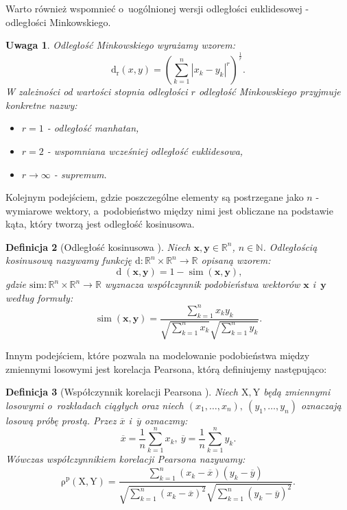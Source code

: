 \documentclass[12pt,a4paper]{report}
\newtheorem{df}{Definicja}[chapter]
\newtheorem{uwaga}[df]{Uwaga}
\newcommand{\setR}{\mathbb{R}}
\newcommand{\setN}{\mathbb{N}}
\newcommand{\rop}[2]{\operatorname{\rho^p}\left( {#1},{#2} \right)}
\newcommand{\similarity}[2]{\operatorname{sim}\left({#1}, {#2} \right)}
\newcommand{\distance}[2]{\operatorname{d}\left({#1}, {#2} \right)}
\newcommand{\distancee}[2]{\operatorname{d_r}\left({#1}, {#2} \right)}
\begin{document}
Warto również wspomnieć o~uogólnionej wersji odległości euklidesowej - odległości Minkowskiego.
\begin{uwaga}
Odległość Minkowskiego wyrażamy wzorem:
$$
\distancee{x}{y} = (\sum_{k=1}^n|x_k-y_k|^r)^{\frac{1}{r}}.
$$
W zależności od wartości stopnia odległości $r$ odległość Minkowskiego przyjmuje konkretne nazwy:
\begin{itemize}
\item $r=1$ - odległość manhatan,
\item $r=2$ - wspomniana wcześniej odległość euklidesowa,
\item $r \to \infty $ - supremum. 
\end{itemize}
\end{uwaga}
Kolejnym podejściem, gdzie poszczególne elementy są postrzegane jako $n$ - wymiarowe wektory, a~podobieństwo między nimi jest obliczane na podstawie kąta, który tworzą jest odległość kosinusowa.

\begin{df}[Odległość kosinusowa \citep{rsh}] %
Niech $\mathbf{x},\mathbf{y} \in \setR^n $, $n \in\setN$. Odległością kosinusową nazywamy funkcję $ \mathrm{d}: \setR^n \times \setR^n \to \setR$ opisaną wzorem:
$$
\distance{\mathbf{x}}{\mathbf{y}} = 1 - \similarity{\mathbf{x}}{\mathbf{y}},
$$ 
gdzie $\mathrm{sim}: \setR^n \times \setR^n \to \setR$ wyznacza współczynnik podobieństwa wektorów $\mathbf{x}$ i~$\mathbf{y}$ według formuły:
$$
\similarity{\mathbf{x}}{\mathbf{y}} = \frac{\sum_{k=1}^n x_k y_k}{\sqrt{\sum_{k=1}^n x_k}\sqrt{\sum_{k=1}^n y_k}}.
$$
\end{df}
Innym podejściem, które pozwala na modelowanie podobieństwa między zmiennymi losowymi jest korelacja Pearsona, którą definiujemy następująco:

\begin{df}[Współczynnik korelacji Pearsona \citep{rsh}]

Niech $\mathrm{X},\mathrm{Y}$ będą zmiennymi losowymi o~rozkładach ciągłych oraz niech $(x_1, \ldots, x_n), \: (y_1, \ldots, y_n)$ oznaczają losową próbę prostą. 
Przez $\overline{x}$ i~$\overline{y}$ oznaczmy:
$$
\overline{x}=\frac{1}{n} \sum_{k=1}^n x_k, \: \overline{y}=\frac{1}{n} \sum_{k=1}^n y_k.
$$
Wówczas współczynnikiem korelacji Pearsona nazywamy:
$$
\rop{\mathrm{X}}{\mathrm{Y}} = \frac{\sum_{k=1}^n(x_k - \overline{x})(y_k - \overline{y})}{\sqrt{\sum_{k=1}^n(x_k - \overline{x})^2} \sqrt{\sum_{k=1}^n(y_k - \overline{y})^2 }}.
$$
\end{df}
\end{document}
